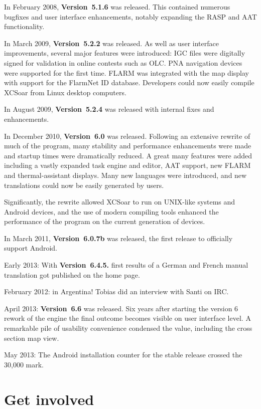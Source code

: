 In February 2008, {\bf Version~5.1.6} was released. This contained 
numerous bugfixes and user interface enhancements, notably expanding 
the RASP and AAT functionality.

In March 2009, {\bf Version~5.2.2} was released. As well as user
interface improvements, several major features were introduced:
IGC files were digitally signed for validation in online contests 
such as OLC.
PNA navigation devices were supported for the
first time. 
FLARM was integrated with the map display with support for the
FlarmNet ID database.
Developers could now easily compile XCSoar from Linux desktop
computers.

In August 2009, {\bf Version~5.2.4} was released with internal
fixes and enhancements.

In December 2010, {\bf Version~6.0} was released. Following an
extensive rewrite of much of the program, many stability and
performance enhancements were made and startup times were 
dramatically reduced. A great many features were added including 
a vastly expanded task engine and editor, AAT support, new FLARM
and thermal-assistant displays. Many new languages were introduced,
and new translations could now be easily generated by users.

Significantly, the rewrite allowed XCSoar to run on UNIX-like
systems and Android devices, and the use of modern compiling 
tools enhanced the performance of the program on the current
generation of devices.

In March 2011, {\bf Version~6.0.7b} was released, the first
release to officially support Android.

Early 2013: With {\bf Version~6.4.5.} first results of a German and French manual
translation got published on the \xc home page.

February 2012:  in Argentina! Tobias did an interview
with Santi on IRC. 

April 2013: {\bf Version~6.6} was released. Six years after starting the version 6 
rework of the \xc engine the final outcome becomes visible on user interface level.
A remarkable pile of usability convenience condensed the \xc value, including
the cross section map view.

May 2013: The Android \xc installation counter for the stable release crossed 
the 30,000 mark.


\section{Get involved}

